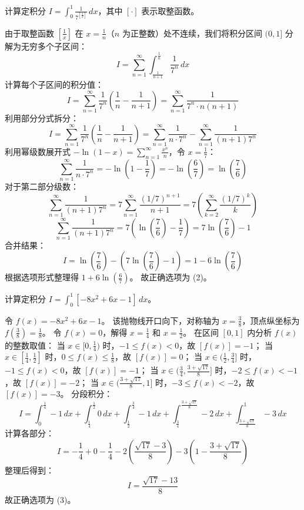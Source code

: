 \begin{questions}
    \question
计算定积分 $I = \int_{0}^{1} \frac{1}{7^{[\frac{1}{x}]}} \, dx$，其中 $[\cdot]$ 表示取整函数。

\begin{solution}
由于取整函数 $[\frac{1}{x}]$ 在 $x = \frac{1}{n}$（$n$ 为正整数）处不连续，我们将积分区间 $(0, 1]$ 分解为无穷多个子区间：
\[
I = \sum_{n=1}^{\infty} \int_{\frac{1}{n+1}}^{\frac{1}{n}} \frac{1}{7^n} \, dx
\]
计算每个子区间的积分值：
\[
I = \sum_{n=1}^{\infty} \frac{1}{7^n} \left( \frac{1}{n} - \frac{1}{n+1} \right) = \sum_{n=1}^{\infty} \frac{1}{7^n \cdot n(n + 1)}
\]
利用部分分式拆分：
\[
I = \sum_{n=1}^{\infty} \frac{1}{7^n} \left( \frac{1}{n} - \frac{1}{n + 1} \right) = \sum_{n=1}^{\infty} \frac{1}{n \cdot 7^n} - \sum_{n=1}^{\infty} \frac{1}{(n + 1)7^n}
\]
利用幂级数展开式 $-\ln(1 - x) = \sum_{n=1}^{\infty} \frac{x^n}{n}$，令 $x = \frac{1}{7}$：
\[
\sum_{n=1}^{\infty} \frac{1}{n \cdot 7^n} = -\ln\left( 1 - \frac{1}{7} \right) = -\ln\left( \frac{6}{7} \right) = \ln\left( \frac{7}{6} \right)
\]
对于第二部分级数：
\[
\sum_{n=1}^{\infty} \frac{1}{(n + 1)7^n} = 7 \sum_{n=1}^{\infty} \frac{(1/7)^{n+1}}{n + 1} = 7 \left( \sum_{k=2}^{\infty} \frac{(1/7)^k}{k} \right)
\]
\[
\sum_{n=1}^{\infty} \frac{1}{(n + 1)7^n} = 7 \left( \ln\left( \frac{7}{6} \right) - \frac{1}{7} \right) = 7 \ln\left( \frac{7}{6} \right) - 1
\]
合并结果：
\[
I = \ln\left( \frac{7}{6} \right) - \left( 7 \ln\left( \frac{7}{6} \right) - 1 \right) = 1 - 6 \ln\left( \frac{7}{6} \right)
\]
根据选项形式整理得 $1 + 6 \ln(\frac{6}{7})$。
故正确选项为 (2)。
\end{solution}

\question
计算定积分 $I = \int_{0}^{1} [-8x^2 + 6x - 1] \, dx$。

\begin{solution}
令 $f(x) = -8x^2 + 6x - 1$。
该抛物线开口向下，对称轴为 $x = \frac{3}{8}$，顶点纵坐标为 $f(\frac{3}{8}) = \frac{1}{8}$。
令 $f(x) = 0$，解得 $x = \frac{1}{4}$ 和 $x = \frac{1}{2}$。
在区间 $[0, 1]$ 内分析 $f(x)$ 的整数取值：
当 $x \in [0, \frac{1}{4})$ 时，$-1 \le f(x) < 0$，故 $[f(x)] = -1$；
当 $x \in [\frac{1}{4}, \frac{1}{2}]$ 时，$0 \le f(x) \le \frac{1}{8}$，故 $[f(x)] = 0$；
当 $x \in (\frac{1}{2}, \frac{3}{4}]$ 时，$-1 \le f(x) < 0$，故 $[f(x)] = -1$；
当 $x \in (\frac{3}{4}, \frac{3 + \sqrt{17}}{8}]$ 时，$-2 \le f(x) < -1$，故 $[f(x)] = -2$；
当 $x \in (\frac{3 + \sqrt{17}}{8}, 1]$ 时，$-3 \le f(x) < -2$，故 $[f(x)] = -3$。
分段积分：
\[
I = \int_{0}^{\frac{1}{4}} -1 \, dx + \int_{\frac{1}{4}}^{\frac{1}{2}} 0 \, dx + \int_{\frac{1}{2}}^{\frac{3}{4}} -1 \, dx + \int_{\frac{3}{4}}^{\frac{3 + \sqrt{17}}{8}} -2 \, dx + \int_{\frac{3 + \sqrt{17}}{8}}^{1} -3 \, dx
\]
计算各部分：
\[
I = -\frac{1}{4} + 0 - \frac{1}{4} - 2\left( \frac{\sqrt{17} - 3}{8} \right) - 3\left( 1 - \frac{3 + \sqrt{17}}{8} \right)
\]
整理后得到：
\[
I = \frac{\sqrt{17} - 13}{8}
\]
故正确选项为 (3)。
\end{solution}


\end{questions}
